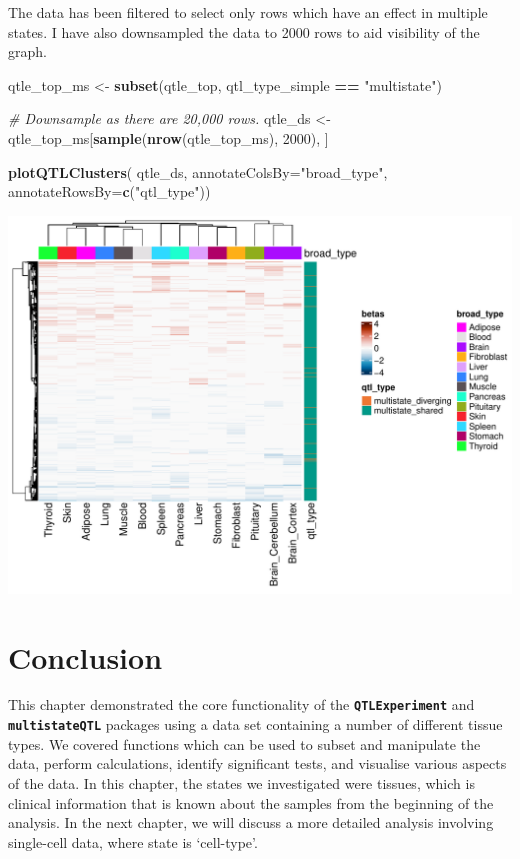 \documentclass[
]{article}
\newenvironment{Shaded}{\begin{snugshade}}{\end{snugshade}}
\newcommand{\AttributeTok}[1]{\textcolor[rgb]{0.13,0.29,0.53}{#1}}
\newcommand{\CommentTok}[1]{\textcolor[rgb]{0.56,0.35,0.01}{\textit{#1}}}
\newcommand{\DecValTok}[1]{\textcolor[rgb]{0.00,0.00,0.81}{#1}}
\newcommand{\FunctionTok}[1]{\textcolor[rgb]{0.13,0.29,0.53}{\textbf{#1}}}
\newcommand{\NormalTok}[1]{#1}
\newcommand{\OtherTok}[1]{\textcolor[rgb]{0.56,0.35,0.01}{#1}}
\newcommand{\SpecialCharTok}[1]{\textcolor[rgb]{0.81,0.36,0.00}{\textbf{#1}}}
\newcommand{\StringTok}[1]{\textcolor[rgb]{0.31,0.60,0.02}{#1}}
\begin{document}
The data has been filtered to select only rows which have an effect in
multiple states. I have also downsampled the data to 2000 rows to aid
visibility of the graph.

\footnotesize

\begin{Shaded}
\begin{Highlighting}[]
\NormalTok{qtle\_top\_ms }\OtherTok{\textless{}{-}} \FunctionTok{subset}\NormalTok{(qtle\_top, qtl\_type\_simple }\SpecialCharTok{==} \StringTok{"multistate"}\NormalTok{)}

\CommentTok{\# Downsample as there are 20,000 rows. }
\NormalTok{qtle\_ds }\OtherTok{\textless{}{-}}\NormalTok{ qtle\_top\_ms[}\FunctionTok{sample}\NormalTok{(}\FunctionTok{nrow}\NormalTok{(qtle\_top\_ms), }\DecValTok{2000}\NormalTok{), ]}

\FunctionTok{plotQTLClusters}\NormalTok{(}
\NormalTok{  qtle\_ds, }
  \AttributeTok{annotateColsBy=}\StringTok{"broad\_type"}\NormalTok{,}
  \AttributeTok{annotateRowsBy=}\FunctionTok{c}\NormalTok{(}\StringTok{"qtl\_type"}\NormalTok{))}
\end{Highlighting}
\end{Shaded}

\includegraphics{GTEx_files/figure-latex/plot-qtl-clusters-gtex-1.pdf}
\normalsize

\section{Conclusion}\label{conclusion}

This chapter demonstrated the core functionality of the
\textbf{\texttt{QTLExperiment}} and \textbf{\texttt{multistateQTL}}
packages using a data set containing a number of different tissue types.
We covered functions which can be used to subset and manipulate the
data, perform calculations, identify significant tests, and visualise
various aspects of the data. In this chapter, the states we investigated
were tissues, which is clinical information that is known about the
samples from the beginning of the analysis. In the next chapter, we will
discuss a more detailed analysis involving single-cell data, where state
is `cell-type'.
\end{document}
